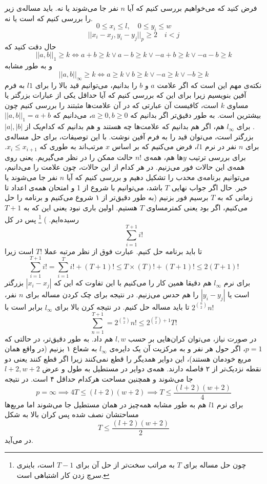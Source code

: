 فرض کنید که می‌خواهیم بررسی کنیم که آیا $n$ نفر جا می‌شوند یا نه. باید مساله‌ی زیر را بررسی کنیم که  است یا نه.
\[
0 \le x_i \le l, \quad 0 \le y_i \le w\]\[
||x_i - x_j, y_i - y_j||_{p} \ge 2\quad i < j
\]
حال دقت کنید که 
\[
||a, b||_{1} \ge k \iff 
a + b \ge k \lor a - b\ge k \lor -a + b \ge k \lor -a - b \ge k
\]
و به طور مشابه
\[
||a, b||_{\infty} \ge k \iff 
a \ge k \lor b \ge k \lor -a \ge k \lor -b \ge k
\]
نکته‌ی مهم این است که اگر علامت $a$ و $b$ را بدانیم، می‌توانیم قید بالا را  برای $l1$ به فرم آفین بنویسیم زیرا برای این که بررسی کنیم که آیا حداقل یکی از عبارات بزرگتر یا مساوی $k$ است، کافیست آن عبارتی که در آن علامت‌ها مثبتند را بررسی کنیم چون بیشترین است. به طور دقیق‌تر اگر بدانیم که 
$a \ge 0, b \ge 0$،
می‌دانیم که 
$||a, b||_1 = a + b$.
برای
$l_{\infty}$
هم، اگر هم بدانیم که علامت‌ها چه هستند و هم بدانیم که کدام‌یک از
$|a|, |b|$
بزرگتر است، می‌توان قید را به فرم آفین نوشت. 
با این توصیفات، برای حل مساله‌ی
برای $n$ نفر در نرم $l1$، فرض می‌کنیم که بر اساس $x$ مرتب‌اند به طوری که 
$x_i \le x_{i + 1}$.
برای بررسی ترتیب $y$‌ها هم، همه‌ی
$n!$
حالت ممکن را در نظر می‌گیریم. یعنی روی همه‌ی این حالات فور می‌زنیم. در هر کدام از این حالات، چون علامت را می‌دانیم، می‌توانیم برنامه‌ی محدب را تشکیل دهیم و بررسی کنیم که آیا $n$ نفر جا می‌شوند یا خیر. حال اگر جواب نهایی $T$ باشد، می‌توانیم با شروع از 1 و امتحان همه‌ی اعداد تا زمانی که به $T$ برسیم فور بزنیم  (به طور دقیق‌تر از ۱ شروع می‌کنیم و برنامه را حل می‌کنیم، اگر  بود یعنی کمتر‌مساوی $T$ هستیم. اولین باری  نبود یعنی این که به 
$T + 1$
رسیده‌ایم.
)
\footnote{
	چون حل مساله برای $T$ به مراتب سخت‌تر از حل آن برای $T- 1$ است، باینری سرچ زدن کار اشتباهی است.
}
پس در کل
\[
\sum_{i=1}^{T + 1}i! 
\]
تا باید برنامه حل کنیم. عبارت فوق از نظر مرتبه عملا $T!$ است زیرا
\[
\sum_{i=1}^{T + 1}i! = \sum_{i=1}^{T}i! + (T+1)! \le T\times (T)! + (T+1)! \le 2(T+1)!
\]
برای نرم
$l_{\infty}$
هم دقیقا همین کار را می‌‌کنیم با این تفاوت که این که 
$|x_{i} - x_{j}|$
بزرگتر است یا
$|y_{i} - y_{j}|$
را هم حدس می‌زنیم. در نتیجه برای چک کردن مساله برای $n$ نفر، 
$2^{\binom{n}{2}}n!$
تا باید مساله حل کنیم. در نتیجه کرن بالا برای 
$l_{\infty}$
برابر است با
\[
\sum_{n=1}^{T+1} = 2^{\binom{n}{2}}n! \le 2^{\binom{T}{2} + 1}T!
\]
در صورت نیاز، می‌توان کران‌هایی بر حسب $l, w$ هم داد. به طور دقیق‌تر، در حالتی که $p=1$، اگر حول هر نفر و به مرکزیت آن یک دایره‌ی
 $l_{\infty}$
 به شعاع ۱ بزنیم (در واقع همان مربع خودمان هستند)، این دوایر همدیگر را قطع نمی‌کنند زیرا اگر قطع کنند یعنی دو نقطه نزدیک‌تر از ۲ فاصله دارند. همه‌ی دوایر در مستطیل به طول و عرض
 $l+2, w+2$
 جا می‌شوند و همچنین مساحت هرکدام حداقل ۴ است. در نتیجه 
 \[
p = \infty \implies 4T \le (l+2)(w+2) \implies T \le \frac{(l+2)(w+2)}{4}
 \]
برای نرم $l1$ هم به طور مشابه همه‌چیز در همان مستطیل جا می‌شوند اما مربع‌ها مساحتشان نصف شده پس کران بالا به شکل
\[
T \le \frac{(l+2)(w+2)}{2}
\]
در می‌آید.

